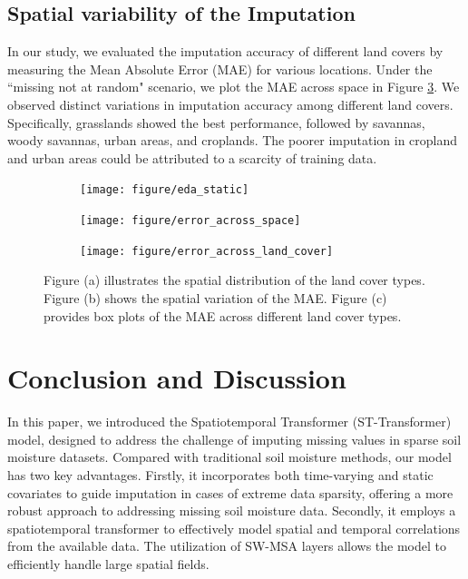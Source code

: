 \documentclass[11pt]{article}
\begin{document}
\subsection{Spatial variability of the Imputation}
In our study, we evaluated the imputation accuracy of different land covers by measuring the Mean Absolute Error (MAE) for various locations. Under the ``missing not at random" scenario, we plot the MAE across space in Figure \ref{fig: mae_across_space}. We observed distinct variations in imputation accuracy among different land covers. Specifically, grasslands showed the best performance, followed by savannas, woody savannas, urban areas, and croplands. The poorer imputation in cropland and urban areas could be attributed to a scarcity of training data.


\begin{figure}
     \centering
      \begin{subfigure}[b]{0.45\textwidth}
		\centering
		\texttt{[image: figure/eda\_static]}
		\caption{}
		\label{fig: missing at time points}
	 \end{subfigure}
         \hfill
      \begin{subfigure}[b]{0.45\textwidth}
         \texttt{[image: figure/error\_across\_space]}
		 \caption{}
	\label{fig: missing at random}
     \end{subfigure}
     
    \begin{subfigure}[b]{\textwidth}
	\texttt{[image: figure/error\_across\_land\_cover]}
	\end{subfigure}
    
     \caption{Figure (a) illustrates the spatial distribution of the land cover types. Figure (b) shows the spatial variation of the MAE. Figure (c) provides box plots of the MAE across different land cover types.}
     \label{fig: mae_across_space}
\end{figure}

 
 





\section{Conclusion and Discussion}
In this paper, we introduced the Spatiotemporal Transformer (ST-Transformer) model, designed to address the challenge of imputing missing values in sparse soil moisture datasets. Compared with traditional soil moisture methods, our model has two key advantages. Firstly, it incorporates both time-varying and static covariates to guide imputation in cases of extreme data sparsity, offering a more robust approach to addressing missing soil moisture data. Secondly, it employs a spatiotemporal transformer to effectively model spatial and temporal correlations from the available data. The utilization of SW-MSA layers allows the model to efficiently handle large spatial fields. 
\end{document}
